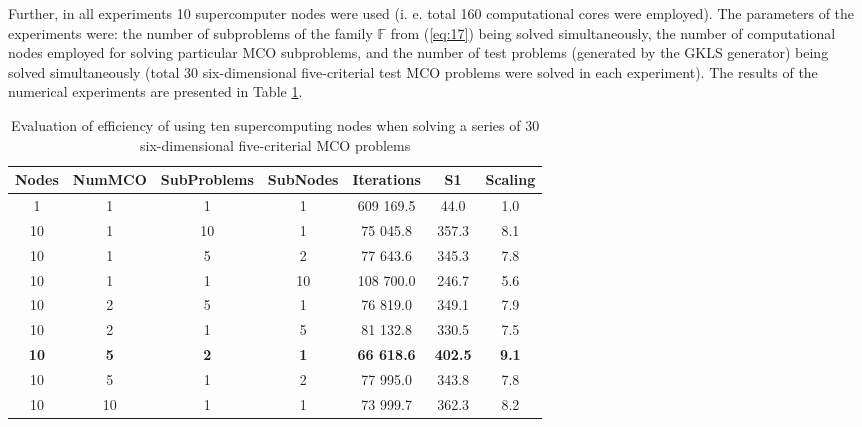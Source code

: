 \documentclass{svproc}
\begin{document}
Further, in all experiments 10 supercomputer nodes were used (i. e. total 160 computational cores were employed). The parameters of the experiments were: the number of subproblems of the family $\mathbb{F}$ from (\ref{eq:17}) being solved simultaneously, the number of computational nodes employed for solving particular MCO subproblems, and the number of test problems (generated by the GKLS generator) being solved simultaneously (total 30 six-dimensional five-criterial test MCO problems were solved in each experiment). The results of the numerical experiments are presented in Table \ref{tab:03}.
%
\begin{table}[htbp]
\centering
\caption{Evaluation of efficiency of using ten supercomputing nodes when solving a series of 30 six-dimensional five-criterial MCO problems}
\label{tab:03}
\begin{tabular}{ccccccc}
\hline
Nodes       & NumMCO     & SubProblems & SubNodes   & Iterations        & S1             & Scaling      \\ \hline
1           & 1          & 1           & 1          & 609 169.5         & 44.0           & 1.0          \\
10          & 1          & 10          & 1          & 75 045.8          & 357.3          & 8.1          \\
10          & 1          & 5           & 2          & 77 643.6          & 345.3          & 7.8          \\
10          & 1          & 1           & 10         & 108 700.0         & 246.7          & 5.6          \\
10          & 2          & 5           & 1          & 76 819.0          & 349.1          & 7.9          \\
10          & 2          & 1           & 5          & 81 132.8          & 330.5          & 7.5          \\
\textbf{10} & \textbf{5} & \textbf{2}  & \textbf{1} & \textbf{66 618.6} & \textbf{402.5} & \textbf{9.1} \\
10          & 5          & 1           & 2          & 77 995.0          & 343.8          & 7.8          \\
10          & 10         & 1           & 1          & 73 999.7          & 362.3          & 8.2          \\ \hline
\end{tabular}
\end{table}
\end{document}
